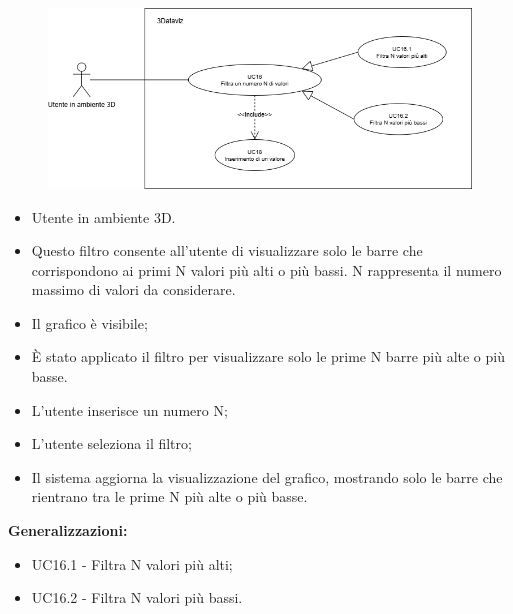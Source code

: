 \begin{figure}[h!]\centering
    \includegraphics[scale=0.6]{template/images/UC16.png}
    \caption{}
\end{figure}
\UCdsc
{ %
    \begin{itemize}
        \item Utente in ambiente 3D.
    \end{itemize}
}
{ %
    \begin{itemize}
        \item Questo filtro consente all'utente di visualizzare solo le barre che corrispondono ai primi N valori più alti o più bassi. 
        N rappresenta il numero massimo di valori da considerare.
    \end{itemize}
}
{ %
    \begin{itemize}
        \item Il grafico è visibile;
    \end{itemize}
}
{ %
    \begin{itemize}
        \item È stato applicato il filtro per visualizzare solo le prime N barre più alte o più basse.
    \end{itemize}
}
{ %
    \begin{itemize}
        \item L'utente inserisce un numero N;
        \item L'utente seleziona il filtro;
        \item Il sistema aggiorna la visualizzazione del grafico, mostrando solo le barre che rientrano tra le prime N più alte o più basse.
    \end{itemize}
        \item \textbf{Generalizzazioni:} \begin{itemize}
            \item UC16.1 - Filtra N valori più alti;
            \item UC16.2 - Filtra N valori più bassi.
        \end{itemize}
}

